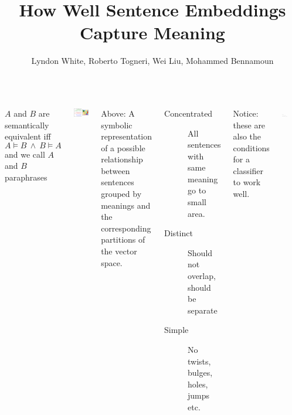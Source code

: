 \documentclass[a0papper, landscape]{tikzposter}
\title{How Well Sentence Embeddings Capture Meaning}
\author{Lyndon White, Roberto Togneri, Wei Liu, Mohammed Bennamoun}
\institute{The University of Western Australia}
\date{}
\begin{document}
\maketitle

\begin{columns}
    
    {
		{
 			$A$ and $B$ are semantically equivalent iff $$A\models B\:\wedge\:B\models A$$
 			and we call $A$ and $B$ paraphrases
 		}
 		\vspace{1.5ex}
		\begin{tikzfigure}
			\includegraphics[scale=2]{equiv}				
		\end{tikzfigure}
		{\small Above: A symbolic representation of a possible relationship between sentences grouped by meanings and the corresponding partitions of the vector space.}
		
		\vspace{2ex}
       	{
       		\begin{description}%
       			\item[Concentrated]\quad All sentences with same meaning go to small area.
       			\item[Distinct]\quad Should not overlap, should be separate      			
       			\item[Simple]\quad No twists, bulges, holes, jumps etc.      			
       		\end{description}
       		
			Notice: these are also the conditions for a classifier to work well.
       	}
       	\vspace{2ex}
 	    {	
   	 		\begin{tikzfigure}
		     	\includegraphics[width=0.29\textwidth]{block_overview_poster}
   	 		\end{tikzfigure}
 	    }
 	}


\end{columns}
\end{document}
